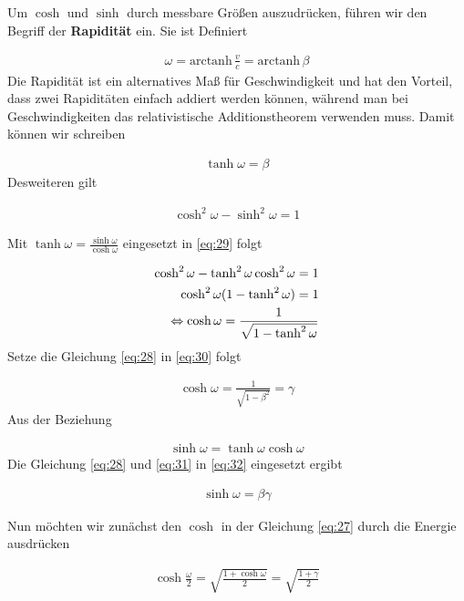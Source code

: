 Um \(\cosh\) und \(\sinh\) durch messbare Größen auszudrücken, führen wir den Begriff der \textbf{Rapidität} ein. Sie ist Definiert

\begin{align}
  \label{eq:20}
  \boxed{ \omega = \text{arctanh}\, \frac{v}{c} = \text{arctanh}\,\beta }
\end{align}
Die Rapidität ist ein alternatives Maß für Geschwindigkeit und hat den Vorteil, dass zwei Rapiditäten einfach addiert werden können, während man bei Geschwindigkeiten das relativistische Additionstheorem verwenden muss. Damit können wir schreiben

\begin{align}
  \label{eq:28}
  \tanh\omega = \beta
\end{align}
Desweiteren gilt

\begin{align}
  \label{eq:29}
  \cosh^2 \omega - \sinh^2\omega = 1
\end{align}

Mit \(\tanh\omega = \frac{\sinh\omega}{\cosh\omega}\) eingesetzt in \eqref{eq:29} folgt

\begin{align}
  \label{eq:30}
  \cosh^2\omega - \tanh^2\omega\cosh^2\omega = 1 \notag\\
  \cosh^2\omega(1- \tanh^2\omega) = 1\notag\\
\Leftrightarrow \cosh\omega = \frac{1}{\sqrt{1-\tanh^2\omega}}
\end{align}
Setze die Gleichung \eqref{eq:28} in \eqref{eq:30} folgt

\begin{align}
  \label{eq:31}
   \boxed{\cosh\omega = \frac{1}{\sqrt{1-\beta^2}} = \gamma }
\end{align}
Aus der Beziehung

\begin{align}
  \label{eq:32}
  \sinh\omega = \tanh\omega\cosh\omega
\end{align}
Die Gleichung \eqref{eq:28} und \eqref{eq:31} in \eqref{eq:32} eingesetzt ergibt

\begin{align}
  \label{eq:33}
  \boxed{\sinh\omega = \beta\gamma}
\end{align}

Nun möchten wir zunächst den \(\cosh\) in der Gleichung \eqref{eq:27} durch die Energie ausdrücken

\begin{align}
  \label{eq:34}
  \cosh\frac{\omega}{2} = \sqrt{\frac{1+\cosh\omega}{2}} = \sqrt{\frac{1+\gamma}{2}} 
\end{align}

